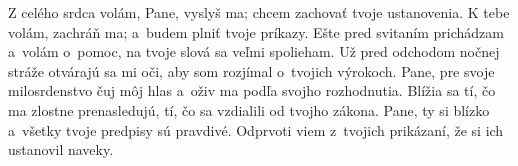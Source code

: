 Z celého srdca volám, Pane, vyslyš ma;
chcem zachovať tvoje ustanovenia.
\versseparator
K tebe volám, zachráň ma;
a~budem plniť tvoje príkazy.
\versseparator
Ešte pred svitaním prichádzam a~volám o~pomoc,
na tvoje slová sa veľmi spolieham.
\versseparator
Už pred odchodom nočnej stráže otvárajú sa mi oči,
aby som rozjímal o~tvojich výrokoch.
\versseparator
Pane, pre svoje milosrdenstvo čuj môj hlas
a~oživ ma podľa svojho rozhodnutia.
\versseparator
Blížia sa tí, čo ma zlostne prenasledujú,
tí, čo sa vzdialili od tvojho zákona.
\versseparator
Pane, ty si blízko
a~všetky tvoje predpisy sú pravdivé.
\versseparator
Odprvoti viem z~tvojich prikázaní,
že si ich ustanovil naveky.